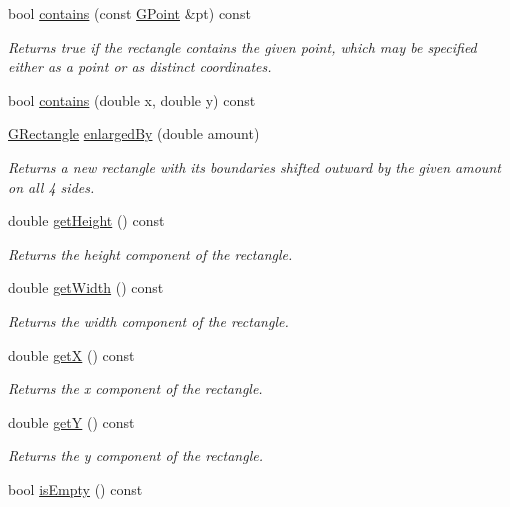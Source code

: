 \begin{DoxyCompactItemize}
bool \mbox{\hyperlink{classGRectangle_a1dbc9dafaae51958112dbe1267a1f547}{contains}} (const \mbox{\hyperlink{classGPoint}{G\+Point}} \&pt) const
\begin{DoxyCompactList}\small\item\em Returns {\ttfamily true} if the rectangle contains the given point, which may be specified either as a point or as distinct coordinates. \end{DoxyCompactList}\item 
bool \mbox{\hyperlink{classGRectangle_abb6a5d7c03e6eaaae97264c4799ce7c3}{contains}} (double x, double y) const
\item 
\mbox{\hyperlink{classGRectangle}{G\+Rectangle}} \mbox{\hyperlink{classGRectangle_adddb08ead701a5144949ca673a44292c}{enlarged\+By}} (double amount)
\begin{DoxyCompactList}\small\item\em Returns a new rectangle with its boundaries shifted outward by the given amount on all 4 sides. \end{DoxyCompactList}\item 
double \mbox{\hyperlink{classGRectangle_a1e7e353362434072875264cf95629f99}{get\+Height}} () const
\begin{DoxyCompactList}\small\item\em Returns the height component of the rectangle. \end{DoxyCompactList}\item 
double \mbox{\hyperlink{classGRectangle_a0ed2965abd4f5701d2cadf71239faf19}{get\+Width}} () const
\begin{DoxyCompactList}\small\item\em Returns the width component of the rectangle. \end{DoxyCompactList}\item 
double \mbox{\hyperlink{classGRectangle_a344385751bee0720059403940d57a13e}{getX}} () const
\begin{DoxyCompactList}\small\item\em Returns the x component of the rectangle. \end{DoxyCompactList}\item 
double \mbox{\hyperlink{classGRectangle_aafa51c7f8f38a09febbb9ce7853f77b4}{getY}} () const
\begin{DoxyCompactList}\small\item\em Returns the y component of the rectangle. \end{DoxyCompactList}\item 
bool \mbox{\hyperlink{classGRectangle_acf82f9b2937375c7b1cf3dccb3df3312}{is\+Empty}} () const

\end{DoxyCompactItemize}
